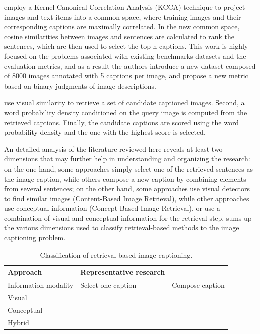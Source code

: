 \citet{Hodosh2013b} employ a Kernel Canonical Correlation Analysis (KCCA) \citep{Bach2003} technique to project images and text items into a common space, where training images and their corresponding captions are maximally correlated. In the new common space, cosine similarities between images and sentences are calculated to rank the sentences, which are then used to select the top-n captions. This work is highly focused on the problems associated with existing benchmarks datasets and the evaluation metrics, and as a result the authors introduce a new dataset composed of 8000 images annotated with 5 captions per image, and propose a new metric based on binary judgments of image descriptions.

\citet{Mason2015} use visual similarity to retrieve a set of candidate captioned images. Second, a word probability density conditioned on the query image is computed from the retrieved captions. Finally, the candidate captions are scored using the word probability density and the one with the highest score is selected. 

An detailed analysis of the literature reviewed here reveals at least two dimensions that may further help in understanding and organizing the research: on the one hand, some approaches simply select one of the retrieved sentences as the image caption, while others compose a new caption by combining elements from several sentences; on the other hand, some approaches use visual detectors to find similar images (Content-Based Image Retrieval), while other approaches use conceptual information (Concept-Based Image Retrieval), or use a combination of visual and conceptual information for the retrieval step.  sums up the various dimensions used to classify retrieval-based methods to the image captioning problem.

\begin{table}[ht]
\centering
\caption{Classification of retrieval-based image captioning.}
\begin{tabular}[t]{p{}p{}p{}}
    \toprule
    Approach & Representative research\\
    \midrule
    Information modality & Select one caption & Compose caption \\
    Visual & \citet{Farhadi2010, Mason2015} & \cite{Gupta2012} \\
    Conceptual &  \cite{Ordonez2011} & \citet{Kuznetsova2012, Kuznetsova2014} \\
    Hybrid &  \citet{Hodosh2013b} & \\
    \bottomrule
\end{tabular}
\label{tab:retrieval_classification}
\end{table}


